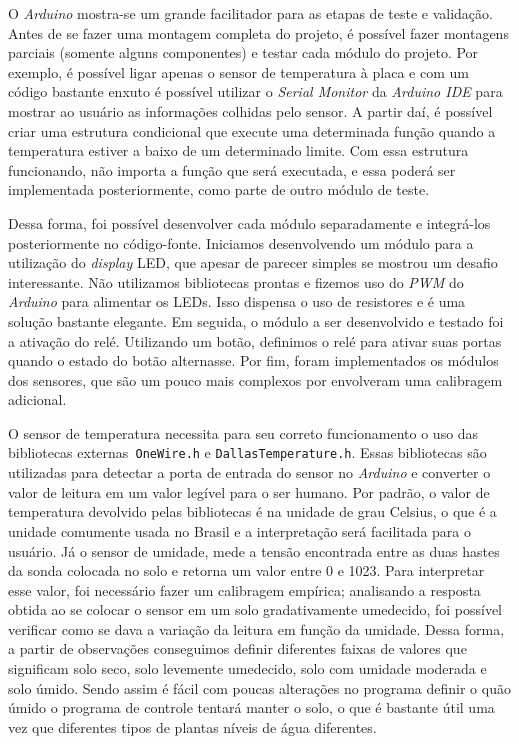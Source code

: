 \documentclass[a4paper,12pt]{article}
\begin{document}
    O \textit{Arduino} mostra-se um grande facilitador para as etapas de teste e validação. Antes de se fazer uma montagem completa do projeto, é possível fazer montagens parciais (somente alguns componentes) e testar cada módulo do projeto. Por exemplo, é possível ligar apenas o sensor de temperatura à placa e com um código bastante enxuto é possível utilizar o \textit{Serial Monitor} da \textit{Arduino IDE} para mostrar ao usuário as informações colhidas pelo sensor. A partir daí, é possível criar uma estrutura condicional que execute uma determinada função quando a temperatura estiver a baixo de um determinado limite. Com essa estrutura funcionando, não importa a função que será executada, e essa poderá ser implementada posteriormente, como parte de outro módulo de teste.

    Dessa forma, foi possível desenvolver cada módulo separadamente e integrá-los posteriormente no código-fonte. Iniciamos desenvolvendo um módulo para a utilização do \textit{display} LED, que apesar de parecer simples se mostrou um desafio interessante. Não utilizamos bibliotecas prontas e fizemos uso do \textit{PWM} do \textit{Arduino} para alimentar os LEDs. Isso dispensa o uso de resistores e é uma solução bastante elegante. Em seguida, o módulo a ser desenvolvido e testado foi a ativação do relé. Utilizando um botão, definimos o relé para ativar suas portas quando o estado do botão alternasse. Por fim, foram implementados os módulos dos sensores, que são um pouco mais complexos por envolveram uma calibragem adicional.

    O sensor de temperatura necessita para seu correto funcionamento o uso das bibliotecas externas\texttt{ OneWire.h} e \texttt{DallasTemperature.h}. Essas bibliotecas são utilizadas para detectar a porta de entrada do sensor no \textit{Arduino} e converter o valor de leitura em um valor legível para o ser humano. Por padrão, o valor de temperatura devolvido pelas bibliotecas é na unidade de grau Celsius, o que é a unidade comumente usada no Brasil e a interpretação será facilitada para o usuário. Já o sensor de umidade, mede a tensão encontrada entre as duas hastes da sonda colocada no solo e retorna um valor entre 0 e 1023. Para interpretar esse valor, foi necessário fazer um calibragem empírica; analisando a resposta obtida ao se colocar o sensor em um solo gradativamente umedecido, foi possível verificar como se dava a variação da leitura em função da umidade. Dessa forma, a partir de observações conseguimos definir diferentes faixas de valores que significam solo seco, solo levemente umedecido, solo com umidade moderada e solo úmido. Sendo assim é fácil com poucas alterações no programa definir o quão úmido o programa de controle tentará manter o solo, o que é bastante útil uma vez que diferentes tipos de plantas níveis de água diferentes.
\end{document}
